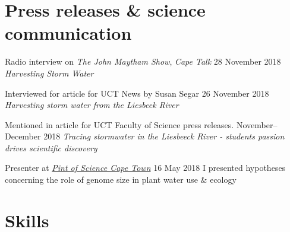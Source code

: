 \documentclass[10pt]{article}
\begin{document}
\section*{Press releases \& science communication} %

\begin{hangparas}{2em}{1}


Radio interview on \textit{The John Maytham Show}, \textit{Cape Talk}
                                         \hfill {\small 28 November 2018} \break
\textit{Harvesting Storm Water}

Interviewed for article for UCT News by Susan Segar
                                         \hfill {\small 26 November 2018} \break
\textit{Harvesting storm water from the Liesbeek River}

Mentioned in article for UCT Faculty of Science press releases.
                                  \hfill {\small November--December 2018} \break
\textit{Tracing stormwater in the Liesbeeck River - students passion drives
scientific discovery}

Presenter at \href{http://pintofsciencesa.wixsite.com/pintofsciencesa/uct-planet-earth-16}
{\textit{Pint of Science Cape Town}}          \hfill {\small 16 May 2018} \break
I presented hypotheses concerning the role of genome size in plant water use 
\& ecology

\end{hangparas}

\vfill

\hrulefill

\clearpage

\section*{Skills} %
\end{document}
